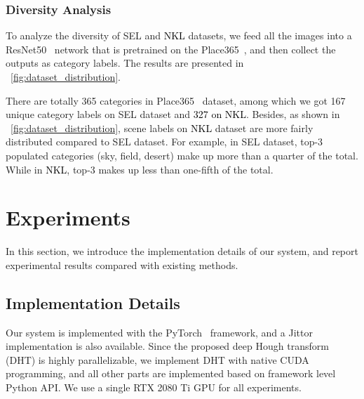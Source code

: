 \documentclass[10pt,journal,cspaper,compsoc]{IEEEtran}
\newcommand{\revise}[1]{{\textcolor{black}{#1}}}
\newcommand{\CheckRmv}[1]{}
\newcommand{\CheckRmv}[1]{#1}
\begin{document}
\subsubsection{Diversity Analysis}
To analyze the diversity of SEL and \revise{NKL} datasets,
we feed all the images into a ResNet50~\cite{he2016deep} network that is pretrained on the Place365~\cite{zhou2017places},
and then collect the outputs as category labels.
The results are presented in ~\cref{fig:dataset_distribution}.

There are totally 365 categories in Place365~\cite{zhou2017places} dataset,
among which we got 167 unique category labels on SEL dataset and \revise{327 on NKL}.
Besides, as shown in ~\cref{fig:dataset_distribution}, scene labels on
\revise{NKL} dataset are more fairly distributed compared to SEL dataset.
For example, in SEL dataset, top-3 populated categories (sky, field, desert) make up more
than a quarter of the total.
While in \revise{NKL}, top-3 makes up less than one-fifth of the total.






\CheckRmv{
\begin{figure*}[tb]
  \centering
  \hfill
  \subfigure[]{
    \begin{overpic}[width=.48\linewidth]{figures/SEL.pdf}
      \put(6, 55){SEL~\cite{lee2017semantic}}
    \end{overpic}
  }\hfill
  \subfigure[]{
    \begin{overpic}[width=0.465\linewidth]{figures/NKL.pdf}
      \put(5, 57){NKL}
    \end{overpic}
  }\hfill
  \vspace{-10pt}
  \caption{
    \revise{
    Category distribution of SEL (a) and NKL (b) datasets.
Category labels are obtained through a Places365 pretrained model.
There are 327 (totally 365) scene labels presented in NKL dataset,
    in contrast to 167 in SEL dataset.
The labels of NKL are also more fairly distributed compared to
    that of SEL.}
  }
  \label{fig:dataset_distribution}
\end{figure*}
}

\section{Experiments}\label{sec:experiments}
In this section, we introduce the implementation details of our system,
and report experimental results compared with existing methods.


\subsection{Implementation Details} \label{sec:protocol}
Our system is implemented with the PyTorch~\cite{paszke2019pytorch} framework,
and a Jittor~\cite{hu2020jittor} implementation is also available.
Since the proposed deep Hough transform (DHT) is highly parallelizable,
we implement DHT with native CUDA programming,
and all other parts are implemented based on framework level Python API.
We use a single RTX 2080 Ti GPU for all experiments.
\end{document}
